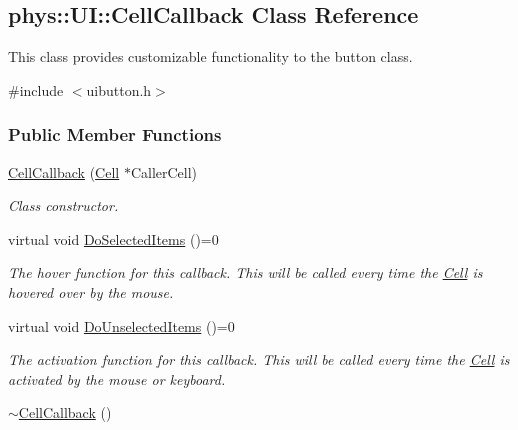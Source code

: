 \hypertarget{classphys_1_1UI_1_1CellCallback}{
\subsection{phys::UI::CellCallback Class Reference}
\label{classphys_1_1UI_1_1CellCallback}
}


This class provides customizable functionality to the button class.  




{\ttfamily \#include $<$uibutton.h$>$}

\subsubsection*{Public Member Functions}
\begin{DoxyCompactItemize}
\item 
\hyperlink{classphys_1_1UI_1_1CellCallback_aec625f93fd825617c7e265f5529516ba}{CellCallback} (\hyperlink{classphys_1_1UI_1_1Cell}{Cell} $\ast$CallerCell)
\begin{DoxyCompactList}\small\item\em Class constructor. \item\end{DoxyCompactList}\item 
\hypertarget{classphys_1_1UI_1_1CellCallback_a7412178ba0954b416418f1ba574957b4}{
virtual void \hyperlink{classphys_1_1UI_1_1CellCallback_a7412178ba0954b416418f1ba574957b4}{DoSelectedItems} ()=0}
\label{classphys_1_1UI_1_1CellCallback_a7412178ba0954b416418f1ba574957b4}

\begin{DoxyCompactList}\small\item\em The hover function for this callback. This will be called every time the \hyperlink{classphys_1_1UI_1_1Cell}{Cell} is hovered over by the mouse. \item\end{DoxyCompactList}\item 
\hypertarget{classphys_1_1UI_1_1CellCallback_ae395358b35ba72c7195e1b2704543fb1}{
virtual void \hyperlink{classphys_1_1UI_1_1CellCallback_ae395358b35ba72c7195e1b2704543fb1}{DoUnselectedItems} ()=0}
\label{classphys_1_1UI_1_1CellCallback_ae395358b35ba72c7195e1b2704543fb1}

\begin{DoxyCompactList}\small\item\em The activation function for this callback. This will be called every time the \hyperlink{classphys_1_1UI_1_1Cell}{Cell} is activated by the mouse or keyboard. \item\end{DoxyCompactList}\item 
\hypertarget{classphys_1_1UI_1_1CellCallback_a15a79254993a90a50e7c6efe60a2089a}{
\hyperlink{classphys_1_1UI_1_1CellCallback_a15a79254993a90a50e7c6efe60a2089a}{$\sim$CellCallback} ()}
\label{classphys_1_1UI_1_1CellCallback_a15a79254993a90a50e7c6efe60a2089a}


\end{DoxyCompactItemize}
